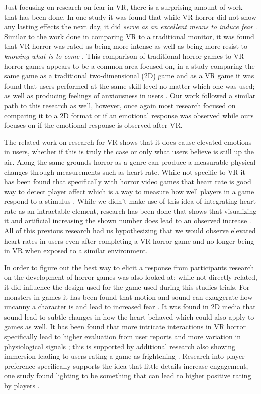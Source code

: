 \documentclass[manuscript,screen,review]{acmart}
\begin{document}
Just focusing on research on fear in VR, there is a surprising amount of work that has been done. In one study it was found that while VR horror did not show any lasting effects the next day, it did \textit{serve as an excellent means to induce fear} \cite{LIN2017350}. Similar to the work done in \cite{Knaust22} comparing VR to a traditional monitor, it was found that VR horror was rated as being more intense as well as being more resist to \textit{knowing what is to come} \cite{10.1007/978-3-319-76270-8_17}. This comparison of traditional horror games to VR horror games appears to be a common area focused on, in a study comparing the same game as a traditional two-dimensional (2D) game and as a VR game it was found that users performed at the same skill level no matter which one was used; as well as producing feelings of anxiousness in users \cite{10.1007/978-3-319-92052-8_8}. Our work followed a similar path to this research as well, however, once again most research focused on comparing it to a 2D format or if an emotional response was observed while ours focuses on if the emotional response is observed after VR.

The related work on research for VR shows that it does cause elevated emotions in users, whether if this is truly the case or only what users believe is still up the air. Along the same grounds horror as a genre can produce a measurable physical changes through measurements such as heart rate. While not specific to VR it has been found that specifically with horror video games that heart rate is good way to detect player affect which is a way to measure how well players in a game respond to a stimulus \cite{Vachiratamporn15}. While we didn't make use of this idea of integrating heart rate as an intractable element, research has been done that shows that visualizing it and artificial increasing the shown number does lead to an observed increase \cite{8329681}. All of this previous research had us hypothesizing that we would observe elevated heart rates in users even after completing a VR horror game and no longer being in VR when exposed to a similar environment.

In order to figure out the best way to elicit a response from participants research on the development of horror games was also looked at; while not directly related, it did influence the design used for the game used during this studies trials. For monsters in games it has been found that motion and sound can exaggerate how uncanny a character is and lead to increased fear \cite{intel:/content/journals/10.1386/jgvw.2.1.3_1}. It was found in 2D media that sound lead to subtle changes in how the heart behaved \cite{7839020} which could also apply to games as well. It has been found that more intricate interactions in VR horror specifically lead to higher evaluation from user reports and more variation in physiological  signals \cite{10.1145/3582437.3582482}; this is supported by additional research also showing immersion leading to users rating a game as frightening \cite{backman2015end}. Research into player preference specifically supports the idea that little details increase engagement, one study found lighting to be something that can lead to higher positive rating by players \cite{armanto2021implementation}.
\end{document}
